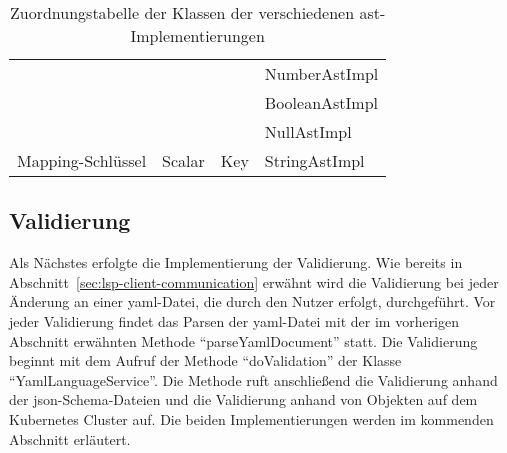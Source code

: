 \begin{table}[htp]
\begin{tabular}{llll}
                                  &                                                                                                                  &                               & NumberAstImpl                                                                                                    \\
                                  &                                                                                                                  &                               & BooleanAstImpl                                                                                                   \\
                                  &                                                                                                                  &                               & NullAstImpl                                                                                                      \\
    \midrule
    Mapping-Schlüssel             & Scalar                                                                                                           & Key                           & StringAstImpl                                                                                                    \\
    \bottomrule
  \end{tabular}
  \caption{Zuordnungstabelle der Klassen der verschiedenen \acs{ast}-Implementierungen}
  \label{tbl:yaml-ast-to-json-ast-convert}
\end{table}

\subsection{Validierung}\label{subsec:validation}

Als Nächstes erfolgte die Implementierung der Validierung. Wie bereits in Abschnitt~\ref{sec:lsp-client-communication} erwähnt wird die
Validierung bei jeder Änderung an einer \ac{yaml}-Datei, die durch den Nutzer erfolgt, durchgeführt.
Vor jeder Validierung findet das Parsen der \ac{yaml}-Datei mit der im vorherigen Abschnitt erwähnten Methode ``parseYamlDocument'' statt.
Die Validierung beginnt mit dem Aufruf der Methode ``doValidation'' der Klasse ``YamlLanguageService''.
Die Methode ruft anschließend die Validierung anhand der \ac{json}-Schema-Dateien und die Validierung anhand von Objekten auf dem Kubernetes Cluster
auf. Die beiden Implementierungen werden im kommenden Abschnitt erläutert.

